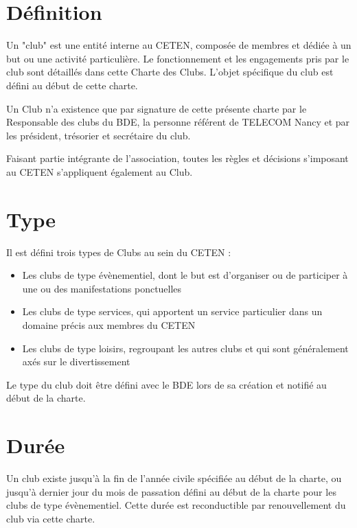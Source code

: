 \documentclass{article} %
\begin{document}
	\begin{multicols}{2}
		
		\section{Définition}
			
			{\small Un "club" est une entité interne au CETEN, composée de
			membres et dédiée à un but ou une activité particulière. Le
			fonctionnement et les engagements pris par le club sont détaillés
			dans cette Charte des Clubs. L’objet spécifique du club est défini
			au début de cette charte.

			Un Club n’a existence que par signature de cette présente charte par
			le Responsable des clubs du BDE, la personne référent de TELECOM
			Nancy et par les président, trésorier et secrétaire du club.

			Faisant partie intégrante de l’association, toutes les règles et
			décisions s’imposant au CETEN s’appliquent également au Club.}

		\section{Type}
			
			{\small Il est défini trois types de Clubs au sein du CETEN :
			\begin{itemize}
				\item Les clubs de type évènementiel, dont le but est
					d’organiser ou de participer à une ou des manifestations
					ponctuelles
				\item Les clubs de type services, qui apportent un service
					particulier dans un domaine précis aux membres du CETEN
				\item Les clubs de type loisirs, regroupant les autres clubs et
					qui sont généralement axés sur le divertissement
			\end{itemize}
			Le type du club doit être défini avec le BDE lors de sa création et
			notifié au début de la charte.}
		
		\section{Durée}
		
			{\small Un club existe jusqu’à la fin de l’année civile spécifiée au
			début de la charte, ou jusqu’à dernier jour du mois de passation
			défini au début de la charte pour les clubs de type évènementiel.
			Cette durée est reconductible par renouvellement du club via cette
			charte.

}
\end{multicols}
\end{document}
